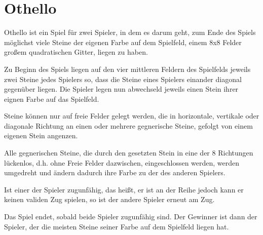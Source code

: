 \section{Othello}

Othello ist ein Spiel für zwei Spieler, in dem es darum geht, zum Ende des Spiels möglichst viele Steine der eigenen Farbe auf dem Spielfeld, einem 8x8 Felder großem quadratischen Gitter, liegen zu haben.

Zu Beginn des Spiels liegen auf den vier mittleren Feldern des Spielfelds jeweils zwei Steine jedes Spielers so, dass die Steine eines Spielers einander diagonal gegenüber liegen.
Die Spieler legen nun abwechseld jeweils einen Stein ihrer eignen Farbe auf das Spielfeld.

Steine können nur auf freie Felder gelegt werden, die in horizontale, vertikale oder diagonale Richtung an einen oder mehrere gegnerische Steine, gefolgt von einem eigenen Stein angenzen.

Alle gegnerischen Steine, die durch den gesetzten Stein in eine der 8 Richtungen lückenlos, d.h. ohne Freie Felder dazwischen, eingeschlossen werden, werden umgedreht und ändern dadurch ihre Farbe zu der des anderen Spielers.

Ist einer der Spieler zugunfähig, das heißt, er ist an der Reihe jedoch kann er keinen validen Zug spielen, so ist der andere Spieler erneut am Zug.

Das Spiel endet, sobald beide Spieler zugunfähig sind. Der Gewinner ist dann der Spieler, der die meisten Steine seiner Farbe auf dem Spielfeld liegen hat.
\cite{worldothellorules}
